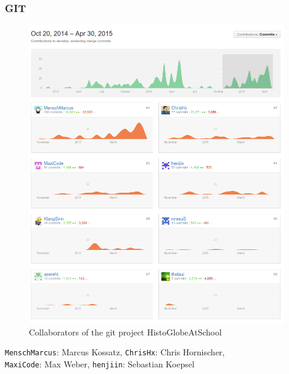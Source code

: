 
\subsubsection{GIT } %
\label{ssub:git_}

\begin{figure}[H]
  \begin{center}
    \includegraphics[width=1\textwidth]{graphics/git.png}
  \end{center}
  \caption{Collaborators of the git project HistoGlobeAtSchool}
  \label{fig:git}
\end{figure}

\begin{center}
\begin{small}
  \texttt{MenschMarcus}: Marcus Kossatz, \texttt{ChrisHx}: Chris Hornischer, \\
  \texttt{MaxiCode}: Max Weber, \texttt{henjiin}: Sebastian Koepsel
\end{small}
\end{center}

